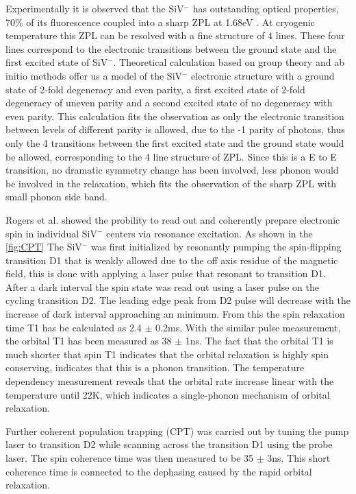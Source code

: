 Experimentally it is observed that the SiV$^{-}$ has outstanding optical properties, 70$\%$ of its fluorescence coupled into a sharp ZPL at 1.68eV \cite{wang_single_2006}. At cryogenic temperature this ZPL can be resolved with a fine structure of 4 lines. These four lines correspond to the electronic transitions between the ground state and the first excited state of SiV$^{-}$. Theoretical calculation based on group theory and ab initio methods offer us a model of the SiV$^{-}$ electronic structure with a ground state of 2-fold degeneracy and even parity, a first excited state of 2-fold degeneracy of uneven parity and a second excited state of no degeneracy with even parity. \citep{goss_twelve-line_1996} This calculation fits the observation as only the electronic transition between levels of different parity is allowed, due to the -1 parity of photons, thus only the 4 transitions between the first excited state and the ground state would be allowed, corresponding to the 4 line structure of ZPL. Since this is a E to E transition, no dramatic symmetry change has been involved, less phonon would be involved in the relaxation, which fits the observation of the sharp ZPL with small phonon side band. 

Rogers et al. showed the probility to read out and coherently prepare electronic spin in individual SiV$^{-}$ centers via resonance excitation. As shown in the \ref{fig:CPT} The SiV$^{-}$ was first initialized by resonantly pumping the spin-flipping transition D1 that is weakly allowed due to the off axis residue of the magnetic field, this is done with applying a laser pulse that resonant to transition D1. After a dark interval the spin state was read out using a laser pulse on the cycling transition D2. The leading edge peak from D2 pulse will decrease with the increase of dark interval approaching an minimum. From this the spin relaxation time T1 has be calculated as 2.4 $\pm$ 0.2ms. With the similar pulse measurement, the orbital T1 has been measured as 38 $\pm$ 1ns. The fact that the orbital T1 is much shorter that spin T1 indicates that the orbital relaxation is highly spin conserving, indicates that this is a phonon transition.  The temperature dependency measurement reveals that the orbital rate increase linear with the temperature until 22K, which indicates a single-phonon mechanism of orbital relaxation.\citep{rogers_all-optical_2014,orbach_spin-lattice_1961,rogers_electronic_2014,scott_spin-lattice_1962}

Further coherent population trapping (CPT) was carried out by tuning the pump laser to transition D2 while scanning across the transition D1 using the probe laser. The spin coherence time was then measured to be 35 $\pm$ 3ns. This short coherence time is connected to the dephasing caused by the rapid orbital relaxation.\citep{rogers_all-optical_2014}

